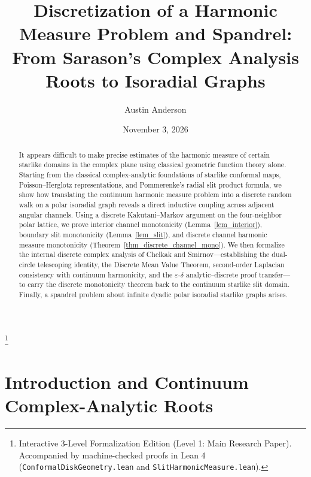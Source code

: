 \documentclass[11pt,reqno]{amsart}
\numberwithin{equation}{section}
\newcommand{\eps}{\varepsilon}
\begin{document}
\title[Discretization of a Harmonic Measure Problem and Spandrel]
{Discretization of a Harmonic Measure Problem and Spandrel:\\
From Sarason's Complex Analysis Roots to Isoradial Graphs}
\date{November 3, 2026}

\author[A. Anderson]{Austin Anderson}

\thanks{Interactive 3-Level Formalization Edition (Level 1: Main Research Paper). Accompanied by machine-checked proofs in Lean 4 (\texttt{ConformalDiskGeometry.lean} and \texttt{SlitHarmonicMeasure.lean}).}

\begin{abstract}
It appears difficult to make precise estimates of the harmonic measure of certain starlike domains in the complex plane using classical geometric function theory alone. Starting from the classical complex-analytic foundations of starlike conformal maps, Poisson--Herglotz representations, and Pommerenke's radial slit product formula, we show how translating the continuum harmonic measure problem into a discrete random walk on a polar isoradial graph reveals a direct inductive coupling across adjacent angular channels. Using a discrete Kakutani--Markov argument on the four-neighbor polar lattice, we prove interior channel monotonicity (Lemma~\ref{lem_interior}), boundary slit monotonicity (Lemma~\ref{lem_slit}), and discrete channel harmonic measure monotonicity (Theorem~\ref{thm_discrete_channel_mono}). We then formalize the internal discrete complex analysis of Chelkak and Smirnov---establishing the dual-circle telescoping identity, the Discrete Mean Value Theorem, second-order Laplacian consistency with continuum harmonicity, and the $\eps$-$\delta$ analytic--discrete proof transfer---to carry the discrete monotonicity theorem back to the continuum starlike slit domain. Finally, a spandrel problem about infinite dyadic polar isoradial starlike graphs arises.
\end{abstract}

\maketitle

\section{Introduction and Continuum Complex-Analytic Roots}
\end{document}
